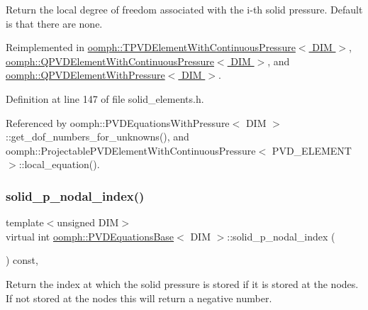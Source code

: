 Return the local degree of freedom associated with the i-\/th solid pressure. Default is that there are none. 



Reimplemented in \hyperlink{classoomph_1_1TPVDElementWithContinuousPressure_a0a299931244a8cc58f90050f38201919}{oomph\+::\+T\+P\+V\+D\+Element\+With\+Continuous\+Pressure$<$ D\+I\+M $>$}, \hyperlink{classoomph_1_1QPVDElementWithContinuousPressure_a97a8b3bc51a27731f21b06c1a95aaf45}{oomph\+::\+Q\+P\+V\+D\+Element\+With\+Continuous\+Pressure$<$ D\+I\+M $>$}, and \hyperlink{classoomph_1_1QPVDElementWithPressure_ad155fc71ac4ba895ffba0924f5a1b687}{oomph\+::\+Q\+P\+V\+D\+Element\+With\+Pressure$<$ D\+I\+M $>$}.



Definition at line 147 of file solid\+\_\+elements.\+h.



Referenced by oomph\+::\+P\+V\+D\+Equations\+With\+Pressure$<$ D\+I\+M $>$\+::get\+\_\+dof\+\_\+numbers\+\_\+for\+\_\+unknowns(), and oomph\+::\+Projectable\+P\+V\+D\+Element\+With\+Continuous\+Pressure$<$ P\+V\+D\+\_\+\+E\+L\+E\+M\+E\+N\+T $>$\+::local\+\_\+equation().

\mbox{\label{classoomph_1_1PVDEquationsBase_a2f879db96640898f0c6f1fc8823520d8}} 
\subsubsection{\texorpdfstring{solid\+\_\+p\+\_\+nodal\+\_\+index()}{solid\_p\_nodal\_index()}}
{\footnotesize\ttfamily template$<$unsigned D\+IM$>$ \\
virtual int \hyperlink{classoomph_1_1PVDEquationsBase}{oomph\+::\+P\+V\+D\+Equations\+Base}$<$ D\+IM $>$\+::solid\+\_\+p\+\_\+nodal\+\_\+index (\begin{DoxyParamCaption}{ }\end{DoxyParamCaption}) const\hspace{0.3cm}{\ttfamily [inline]}, {\ttfamily [virtual]}}



Return the index at which the solid pressure is stored if it is stored at the nodes. If not stored at the nodes this will return a negative number. 



